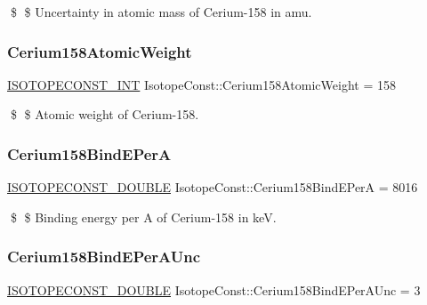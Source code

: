 \$ \$ Uncertainty in atomic mass of Cerium-\/158 in amu. \mbox{\label{group___isotope_const-_cerium-_ce158_ga92c17a81faf4a018af1114599404a49d}} 
\subsubsection{\texorpdfstring{Cerium158\+Atomic\+Weight}{Cerium158AtomicWeight}}
{\footnotesize\ttfamily \mbox{\hyperlink{group___isotope_const-_macros_ga5f18360b3e99483a35c32d789e62621c}{I\+S\+O\+T\+O\+P\+E\+C\+O\+N\+S\+T\+\_\+\+I\+NT}} Isotope\+Const\+::\+Cerium158\+Atomic\+Weight = 158}

\$ \$ Atomic weight of Cerium-\/158. \mbox{\label{group___isotope_const-_cerium-_ce158_gab937f9e5fc2988421057403f5a7a65e9}} 
\subsubsection{\texorpdfstring{Cerium158\+Bind\+E\+PerA}{Cerium158BindEPerA}}
{\footnotesize\ttfamily \mbox{\hyperlink{group___isotope_const-_macros_ga8f45a7272ce02c0b4c65c44636ed719a}{I\+S\+O\+T\+O\+P\+E\+C\+O\+N\+S\+T\+\_\+\+D\+O\+U\+B\+LE}} Isotope\+Const\+::\+Cerium158\+Bind\+E\+PerA = 8016}

\$ \$ Binding energy per A of Cerium-\/158 in keV. \mbox{\label{group___isotope_const-_cerium-_ce158_gafaa8f09004209489a8cd3e8016735078}} 
\subsubsection{\texorpdfstring{Cerium158\+Bind\+E\+Per\+A\+Unc}{Cerium158BindEPerAUnc}}
{\footnotesize\ttfamily \mbox{\hyperlink{group___isotope_const-_macros_ga8f45a7272ce02c0b4c65c44636ed719a}{I\+S\+O\+T\+O\+P\+E\+C\+O\+N\+S\+T\+\_\+\+D\+O\+U\+B\+LE}} Isotope\+Const\+::\+Cerium158\+Bind\+E\+Per\+A\+Unc = 3}

